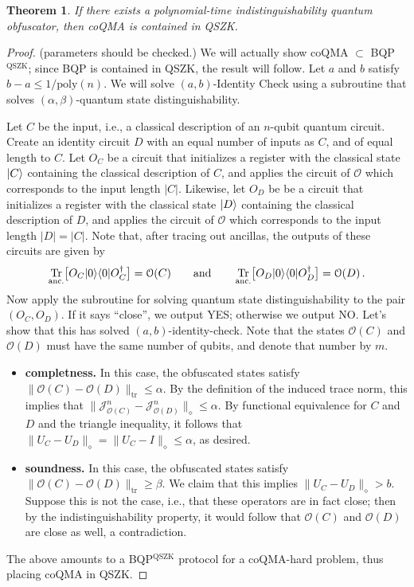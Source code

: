 \documentclass[11pt]{article}
\DeclareMathOperator{\tr}{Tr}
\numberwithin{equation}{section}
\newtheorem{theorem}{Theorem}
\begin{document}
\begin{theorem}
If there exists a polynomial-time indistinguishability quantum obfuscator, then coQMA is contained in QSZK.
\end{theorem}
\begin{proof}
(parameters should be checked.) We will actually show coQMA $\subset$ BQP$^{\text{QSZK}}$; since BQP is contained in QSZK, the result will follow. Let $a$ and $b$ satisfy $b-a \leq 1 / \text{poly}(n)$. We will solve $(a, b)$-Identity Check using a subroutine that solves $(\alpha, \beta)$-quantum state distinguishability. 

Let $C$ be the input, i.e., a classical description of an $n$-qubit quantum circuit. Create an identity circuit $D$ with an equal number of inputs as $C$, and of equal length to $C$. Let $O_C$ be a circuit that initializes a register with the classical state ${\left\vert{C}\right\rangle}$ containing the classical description of $C$, and applies the circuit of $\mathcal O$ which corresponds to the input length $|C|$. Likewise, let $O_D$ be be a circuit that initializes a register with the classical state ${\left\vert{D}\right\rangle}$ containing the classical description of $D$, and applies the circuit of $\mathcal O$ which corresponds to the input length $|D| = |C|$. Note that, after tracing out ancillas, the outputs of these circuits are given by
$$
\tr_\text{anc.} \bigl[O_C\ket{0}\bra{0}O_C^\dagger\bigr] = \mathcal O(C)
\qquad \text{and} \qquad
\tr_\text{anc.} \bigl[O_D\ket{0}\bra{0}O_D^\dagger\bigr] = \mathcal O(D)\,.
$$
Now apply the subroutine for solving quantum state distinguishability to the pair $(O_C, O_D)$. If it says ``close'', we output YES; otherwise we output NO. Let's show that this has solved $(a, b)$-identity-check. Note that the states $\mathcal O(C)$ and $\mathcal O(D)$ must have the same number of qubits, and denote that number by $m$.
\begin{itemize}
\item \textbf{completness.} In this case, the obfuscated states satisfy $\|\mathcal O(C) - \mathcal O(D)\|_\text{tr} \leq \alpha$.  By the definition of the induced trace norm, this implies that $\|\mathcal J_{\mathcal O(C)}^n - \mathcal J_{\mathcal O(D)}^n\|_\diamond \leq \alpha$. By functional equivalence for $C$ and $D$ and the triangle inequality, it follows that $\|U_C - U_D\|_\diamond = \|U_C - I\|_\diamond \leq \alpha$, as desired.

\item \textbf{soundness.} In this case, the obfuscated states satisfy $\|\mathcal O(C) - \mathcal O(D)\|_\text{tr} \geq \beta$. We claim that this implies $\|U_C - U_D\|_\diamond > b$. Suppose this is not the case, i.e., that these operators are in fact close; then by the indistinguishability property, it would follow that $\mathcal O(C)$ and $\mathcal O(D)$ are close as well, a contradiction.
\end{itemize}
The above amounts to a BQP$^\text{QSZK}$ protocol for a coQMA-hard problem, thus placing coQMA in QSZK.
\end{proof}
\end{document}
